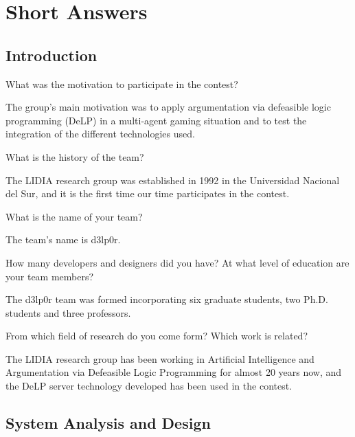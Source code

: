 
\section*{Short Answers}


\subsection{Introduction}

\begin{question}
What was the motivation to participate in the contest?  
\end{question}

The group's main motivation was to apply argumentation via defeasible 
logic programming (DeLP) in a multi-agent gaming situation and to test the
integration of the different technologies used.

\begin{question}
What is the history of the team?  
\end{question}
The LIDIA research group was established in 1992 in the Universidad 
Nacional del Sur, and it is the first time our time participates in the 
contest.

\begin{question}
What is the name of your team?  
\end{question}

The team's name is d3lp0r.

\begin{question}
How many developers and designers did you have?  At what level of education
are your team members?  
\end{question}

The d3lp0r team was formed incorporating six graduate
students, two Ph.D. students and three professors.

\begin{question}
From which field of research do you come form?  Which work is related?  
\end{question}
The
LIDIA research group has been working in Artificial Intelligence and
Argumentation via Defeasible Logic Programming for almost 20 years now, and
the DeLP server technology developed has been used in the contest.

\subsection{System Analysis and Design}

